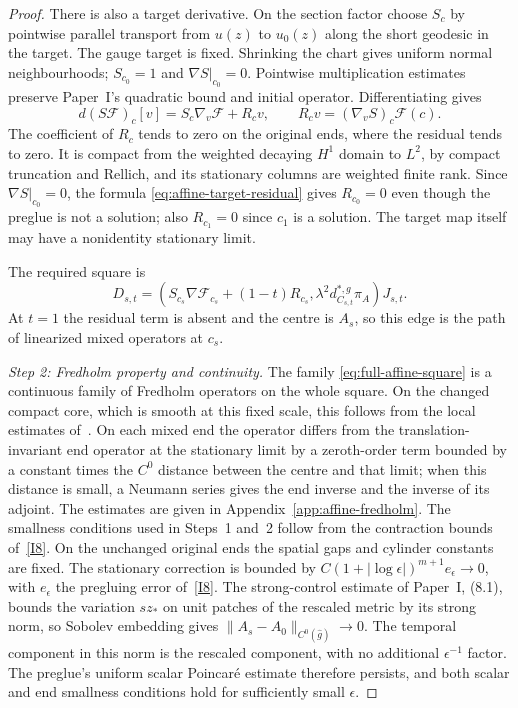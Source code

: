 \documentclass[11pt]{amsart}
\theoremstyle{definition}
\theoremstyle{remark}
\theoremstyle{plain}
\numberwithin{equation}{section}
\begin{document}
\begin{proof}
There is also a target derivative. On the section factor choose
$S_c$ by pointwise parallel transport from $u(z)$ to $u_0(z)$
along the short geodesic in the target. The gauge target is
fixed. Shrinking the chart gives uniform normal neighbourhoods;
$S_{c_0}=1$ and $\nabla S|_{c_0}=0$. Pointwise multiplication
estimates preserve Paper~I's quadratic bound and initial
operator. Differentiating gives
\begin{equation}\label{eq:affine-target-residual}
 d(S\mathcal F)_c[v]=S_c\nabla_v\mathcal F+R_cv,
 \qquad R_cv=(\nabla_v S)_c\mathcal F(c).
\end{equation}
The coefficient of $R_c$ tends to zero on the original ends,
where the residual tends to zero. It is compact from the
weighted decaying $H^1$ domain to $L^2$, by compact truncation
and Rellich, and its stationary columns are weighted finite
rank. Since $\nabla S|_{c_0}=0$, the formula
\eqref{eq:affine-target-residual} gives $R_{c_0}=0$ even though the
preglue is not a solution; also $R_{c_1}=0$ since $c_1$ is a solution. The target
map itself may have a nonidentity stationary limit.

The required square is
\begin{equation}\label{eq:full-affine-square}
 D_{s,t}=\left(S_{c_s}\nabla\mathcal F_{c_s}+(1-t)R_{c_s},
       \lambda^2d_{C_{s,t}}^{*,g}\pi_A\right)J_{s,t}.
\end{equation}
At $t=1$ the residual term is absent and the centre is $A_s$,
so this edge is the path of linearized mixed operators at
$c_s$.

\emph{Step 2: Fredholm property and continuity.} The family
\eqref{eq:full-affine-square} is a continuous family of Fredholm
operators on the whole square. On the changed compact core, which is
smooth at this fixed scale, this follows from the local estimates
of~\cite{DFL,DFL-mixed}. On each mixed end the operator differs from the
translation-invariant end operator at the stationary limit by a
zeroth-order term bounded by a constant times the $C^0$ distance between
the centre and that limit; when this distance is small, a Neumann series
gives the end inverse and the inverse of its adjoint. The estimates are
given in Appendix~\ref{app:affine-fredholm}. The smallness conditions used in Steps~1 and~2 follow from the
contraction bounds of~\ref{I8}.
On the unchanged original ends the spatial gaps and cylinder
constants are fixed. The stationary correction is bounded by
$C(1+|\log\epsilon|)^{m+1}e_\epsilon\to0$, with $e_\epsilon$
the pregluing error of~\ref{I8}. The strong-control estimate of
Paper~I, (8.1), bounds the variation $sz_*$ on unit patches of the
rescaled metric by its strong norm, so Sobolev embedding gives
$\|A_s-A_0\|_{C^0(\widehat g)}\to0$. The temporal component
in this norm is the rescaled component, with no additional
$\epsilon^{-1}$ factor. The preglue's uniform scalar Poincar\'e
estimate therefore persists, and both scalar and end
smallness conditions hold for sufficiently small $\epsilon$.


\end{proof}
\end{document}
